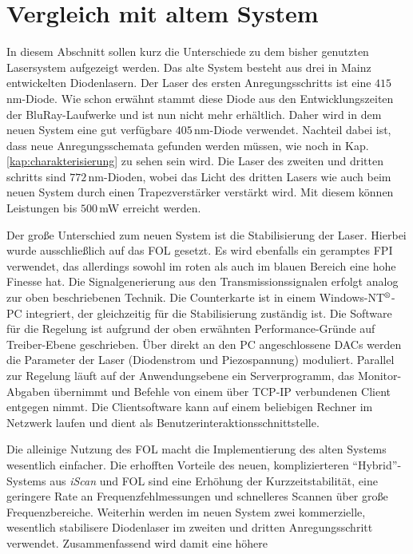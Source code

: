 \section{Vergleich mit altem System}\label{sec:vergleich_mit_altem_system}
In diesem Abschnitt sollen kurz die Unterschiede zu dem bisher genutzten
Lasersystem aufgezeigt werden. Das alte System besteht aus drei in Mainz
entwickelten Diodenlasern. Der Laser des ersten Anregungsschritts ist eine
$415\,$nm-Diode. Wie schon erwähnt stammt diese Diode aus den Entwicklungszeiten
der BluRay-Laufwerke und ist nun nicht mehr erhältlich. Daher wird in dem neuen
System eine gut verfügbare $405\,$nm-Diode verwendet. Nachteil dabei ist, dass
neue Anregungsschemata gefunden werden müssen, wie noch in Kap.
\ref{kap:charakterisierung} zu sehen sein wird. Die Laser des zweiten und
dritten schritts sind $772\,$nm-Dioden, wobei das Licht des dritten Lasers wie
auch beim neuen System durch einen Trapezverstärker verstärkt wird. Mit diesem
können Leistungen bis $500\,$mW erreicht werden.\par
Der große Unterschied zum neuen System ist die Stabilisierung der Laser. Hierbei
wurde ausschließlich auf das FOL gesetzt. Es wird ebenfalls
ein geramptes FPI verwendet, das allerdings sowohl im roten als auch im blauen
Bereich eine hohe Finesse hat. Die Signalgenerierung aus den
Transmissionssignalen erfolgt analog zur oben beschriebenen Technik. Die
Counterkarte ist in einem Windows-NT$^\text{\textregistered}$-PC integriert, der
gleichzeitig für die Stabilisierung zuständig ist. Die Software für die Regelung
ist aufgrund der oben erwähnten Performance-Gründe auf Treiber-Ebene
geschrieben. Über direkt an den PC angeschlossene DACs werden die Parameter der
Laser (Diodenstrom und Piezospannung) moduliert. Parallel zur Regelung läuft auf
der Anwendungsebene ein Serverprogramm, das Monitor-Abgaben übernimmt und
Befehle von einem über TCP-IP verbundenen Client entgegen nimmt. Die
Clientsoftware kann auf einem beliebigen Rechner im Netzwerk laufen und dient
als Benutzerinteraktionsschnittstelle.\par
Die alleinige Nutzung des FOL macht die Implementierung des
alten Systems wesentlich einfacher. Die erhofften Vorteile des neuen,
komplizierteren "`Hybrid"'-Systems aus \textit{iScan} und FOL
sind eine Erhöhung der Kurzzeitstabilität, eine geringere Rate an Frequenzfehlmessungen
und schnelleres Scannen über große Frequenzbereiche. Weiterhin werden im neuen
System zwei kommerzielle, wesentlich stabilisere Diodenlaser im zweiten und
dritten Anregungsschritt verwendet. Zusammenfassend wird damit eine höhere
